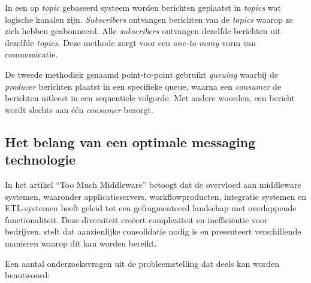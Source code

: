 In een op \emph{topic} gebaseerd systeem worden berichten geplaatst in \emph{topics} wat logische kanalen zijn.
\emph{Subscribers} ontvangen berichten van de \emph{topics} waarop ze zich hebben geabonneerd.
Alle \emph{subscribers} ontvangen dezelfde berichten uit dezelfde \emph{topics}. 
Deze methode zorgt voor een \emph{one-to-many} vorm van communicatie.
\newline

De tweede methodiek genaamd point-to-point gebruikt \emph{queuing} waarbij de \emph{producer} berichten plaatst in een specifieke queue, 
waarna een \emph{consumer} de berichten uitleest in een sequentiele volgorde. 
Met andere woorden, een bericht wordt slechts aan één \emph{consumer} bezorgt.

\newpage

\subsection{Het belang van een optimale \newline messaging technologie}

In het artikel ``Too Much Middleware'' betoogt \textcite{Stonebraker2002} dat de overvloed aan middleware systemen, 
waaronder applicatieservers, workflowproducten, integratie systemen en \newline ETL-systemen heeft geleid tot een gefragmenteerd landschap 
met overlappende functionaliteit. 
Deze diversiteit creëert complexiteit en inefficiëntie voor bedrijven. 
\textcite{Stonebraker2002} stelt dat aanzienlijke consolidatie nodig is en presenteert verschillende manieren waarop dit kan worden bereikt.
\newline

Een aantal onderzoeksvragen uit de probleemstelling dat deels kan worden beantwoord:

